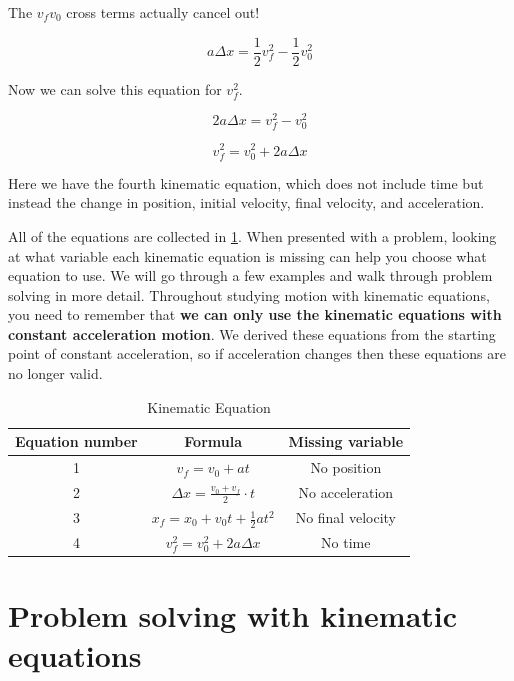 \documentclass[12pt]{book}
\begin{document}
The $v_f v_0$ cross terms actually cancel out!

\begin{equation}
a \Delta x = \frac{1}{2} v_f^2 - \frac{1}{2} v_0^2
\end{equation}

Now we can solve this equation for $v_f^2$.

\begin{equation}
2 a \Delta x	 = v_f^2 - v_0^2
\end{equation}

\begin{equation}
v_f^2 = v_0^2 + 2 a \Delta x
\label{km4}
\end{equation}

Here we have the fourth kinematic equation, which does not include time but instead the change in position, initial velocity, final velocity, and acceleration.

All of the equations are collected in \ref{kmtable}. When presented with a problem, looking at what variable each kinematic equation is missing can help you choose what equation to use. We will go through a few examples and walk through problem solving in more detail. Throughout studying motion with kinematic equations, you need to remember that \textbf{we can only use the kinematic equations with constant acceleration motion}. We derived these equations from the starting point of constant acceleration, so if acceleration changes then these equations are no longer valid. 

\begin{table}[b]
\large
\centering
\caption{Kinematic Equation}
\label{kmtable}
\begin{tabular}{| c | c | c |}
	\hline
	Equation number & Formula & Missing variable \\
	\hline
	1 & $v_f = v_0 + at$ & No position \\[5pt] \hline
	2 & $\Delta x = \frac{v_0 + v_f}{2} \cdot t$ & No acceleration \\[5pt] \hline
	3 & $x_f = x_0 + v_0 t + \frac{1}{2} a t^2$ & No final velocity \\[5pt] \hline
	4 & $v_f^2 = v_0^2 + 2 a \Delta x$ & No time \\[5pt]
	\hline
\end{tabular}
\end{table}

\newpage

\section{Problem solving with kinematic equations}
\end{document}
